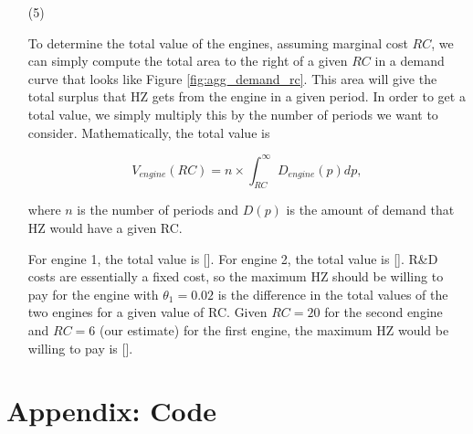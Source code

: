 \documentclass[paper=a4, fontsize=11pt]{scrartcl} %
\numberwithin{equation}{section} %
\numberwithin{figure}{section} %
\numberwithin{table}{section} %
\newcommand{\mylisting}[2][]{%
}
\begin{document}
\begin{itemize}
\begin{itemize}
\item[(5)]

To determine the total value of the engines, assuming marginal cost $RC$, we can simply compute the total area to the right of a given $RC$ in a demand curve that looks like Figure \ref{fig:agg_demand_rc}. This area will give the total surplus that HZ gets from the engine in a given period.  In order to get a total value, we simply multiply this by the number of periods we want to consider. Mathematically, the total value is 

\begin{equation}
V_{engine}(RC) = n \times \int_{RC}^{\infty} D_{engine}(p) dp,
\end{equation}

\noindent where $n$ is the number of periods and $D(p)$ is the amount of demand that HZ would have a given RC.

For engine 1, the total value is []. For engine 2, the total value is []. R\&D costs are essentially a fixed cost, so the maximum HZ should be willing to pay for the engine with $\theta_1 = 0.02$ is the difference in the total values of the two engines for a given value of RC. Given $RC = 20$ for the second engine and $RC = 6$ (our estimate) for the first engine, the maximum HZ would be willing to pay is [].

\end{itemize}

\end{itemize}

\section*{Appendix: Code}

\mylisting[language=R]{./rust.R}
\end{document}
